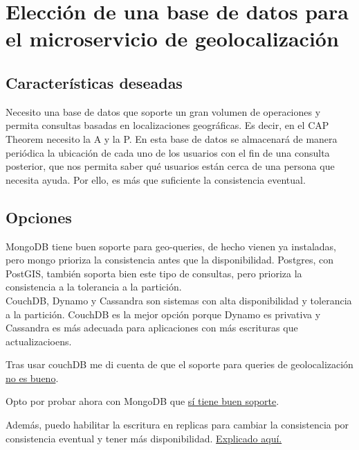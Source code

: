 \chapter{Elección de una base de datos para el microservicio de geolocalización}

\section{Características deseadas}
Necesito una base de datos que soporte un gran volumen de operaciones y permita consultas basadas en localizaciones geográficas. Es decir, en el CAP Theorem necesito la A y la P.
En esta base de datos se almacenará de manera periódica la ubicación de cada uno de los usuarios con el fin de una consulta posterior, que nos permita saber qué usuarios
están cerca de una persona que necesita ayuda. Por ello, es más que suficiente la consistencia eventual.

\section{Opciones}

MongoDB tiene buen soporte para geo-queries, de hecho vienen ya instaladas, pero mongo prioriza la consistencia antes que la disponibilidad. Postgres, con PostGIS, también soporta bien
este tipo de consultas, pero prioriza la consistencia a la tolerancia a la partición. \\
CouchDB, Dynamo y Cassandra son sistemas con alta disponibilidad y tolerancia a la partición. CouchDB es la mejor opción porque Dynamo es privativa y Cassandra es más adecuada para aplicaciones con más
escrituras que actualizacioens. 

Tras usar couchDB me di cuenta de que el soporte para queries de geolocalización \href{https://docs.couchdb.org/en/stable/ddocs/search.html?highlight=geospatial#geographical-searches}{no es bueno}.

Opto por probar ahora con MongoDB que \href{https://stackoverflow.com/questions/25734092/query-locations-within-a-radius-in-mongodb}{sí tiene buen soporte}.

Además, puedo habilitar la escritura en replicas para cambiar la consistencia por consistencia eventual y tener más disponibilidad. \href{https://stackoverflow.com/questions/11292215/where-does-mongodb-stand-in-the-cap-theorem}{Explicado aquí.}
